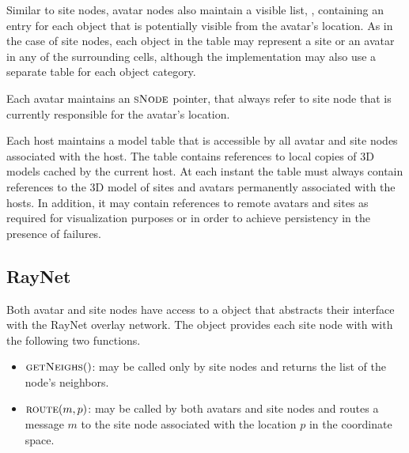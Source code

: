 


\dstruct{\vlist}
Similar to site nodes, avatar nodes also maintain a visible list,
\vlist, containing an entry for each object that is potentially
visible from the avatar's location. As in the case of site nodes, each
object in the table may represent a site or an avatar in any of the
surrounding cells, although the implementation may also use a separate
table for each object category.


\dstruct{\snode}
Each avatar maintains an $\textsc{sNode}$ pointer, that always refer to site
node that is currently responsible for the avatar's location.

\dstruct{\modtab}
Each host maintains a model table \modtab that is accessible by all
avatar and site nodes associated with the host. The table contains
references to local copies of 3D models cached by the current host. At
each instant the \modtab table must always contain references to the
3D model of sites and avatars permanently associated with the
hosts. In addition, it may contain references to remote avatars and
sites as required for visualization purposes or in order to achieve
persistency in the presence of failures.

\newcommand{\achange}{\ensuremath{\textsc{avChange}}\xspace}
\newcommand{\adesc}{\ensuremath{\textsc{avDesc}}\xspace}
\newcommand{\newsnode}{\ensuremath{\textsc{NewSiteNode}}\xspace}
\newcommand{\cursite}{\ensuremath{\textsc{curSite}}\xspace}


\subsection{RayNet}
Both avatar and site nodes have access to a \rn object that abstracts
their interface with the RayNet overlay network. The \rn object
provides each site node with with the following two functions.
\begin{itemize}
\item $\textsc{getNeighs}()$: may be called only by site nodes and returns the list
  of the node's neighbors.
\item 
$\textsc{route}(m, p)$: may be called by both avatars and site nodes and routes a
message $m$ to the site node associated with the location $p$ in the
coordinate space. 
\end{itemize}



